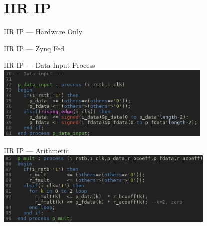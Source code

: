 \documentclass{beamer}
\begin{document}
\section{IIR IP}
\begin{frame}{IIR IP --- Hardware Only}
\end{frame}
\begin{frame}{IIR IP --- Zynq Fed}
\end{frame}
\begin{frame}{IIR IP --- Data Input Process }
  \includegraphics[height=3.5cm]
                  {data-input.png}
\end{frame}
\begin{frame}{IIR IP --- Arithmetic}
  \includegraphics[height=3.5cm]
                  {mult.png}
\end{frame}
\end{document}
